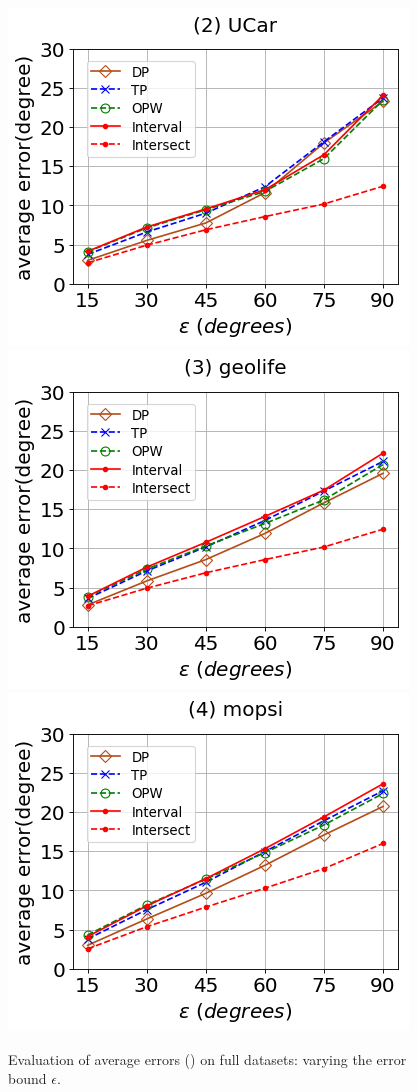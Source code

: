 \begin{figure}[tb!]
	\centering
	\includegraphics[scale=0.320]{Figures/Exp-DAD-error-epsilon-service.png}	\hspace{3ex}
	\includegraphics[scale=0.320]{Figures/Exp-DAD-error-epsilon-geolife.png}	\hspace{3ex}
	\includegraphics[scale=0.320]{Figures/Exp-DAD-error-epsilon-mopsi.png}	
	\vspace{-2ex}
	\caption{\small Evaluation of average errors (\dad) on full datasets: varying the error bound $\epsilon$.}
	\label{fig:ae-dad-epsilon}
	\vspace{-2ex}
\end{figure}

